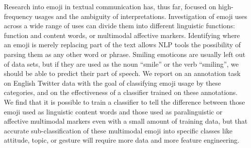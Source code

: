 Research into emoji in textual communication has, thus far, focused on high-frequency usages and the ambiguity of interpretations. Investigation of emoji uses across a wide range of uses can divide them into different linguistic functions: function and content words, or multimodal affective markers. Identifying where an emoji is merely replacing part of the text allows NLP tools the possibility of parsing them as any other word or phrase. Smiling emoticons are usually left out of data sets, but if they are used as the noun ``smile'' or the verb ``smiling'', we should be able to predict their part of speech. We report on an annotation task on English Twitter data with the goal of classifying emoji usage by these categories, and on the effectiveness of a classifier trained on these annotations. We find that it is possible to train a classifier to tell the difference between those emoji used as linguistic content words and those used as paralinguistic or affective multimodal markers even with a small amount of training data, but that accurate sub-classification of these multimodal emoji into specific classes like attitude, topic, or gesture will require more data and more feature engineering.
